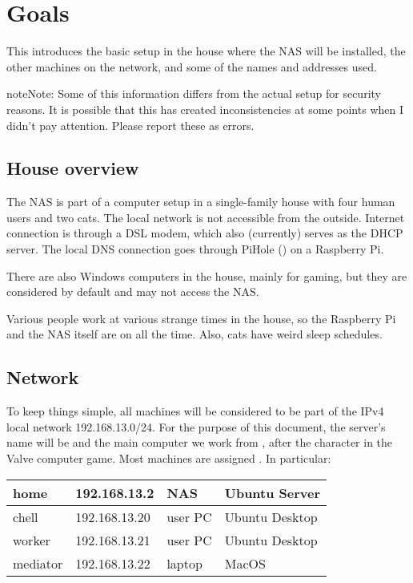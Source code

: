 \documentclass[a4paper,10pt,english]{sphinxmanual}
\begin{document}
\chapter{Goals}
\label{\detokenize{goals:goals}}\label{\detokenize{goals::doc}}
This introduces the basic setup in the house where the NAS will be installed,
the other machines on the network, and some of the names and addresses used.

\begin{sphinxadmonition}{note}{Note:}
Some of this information differs from the actual setup for security
reasons. It is possible that this has created inconsistencies at some
points when I didn’t pay attention. Please report these as errors.
\end{sphinxadmonition}


\section{House overview}
\label{\detokenize{goals:house-overview}}
The NAS is part of a computer setup in a single-family house with four human
users and two cats. The local network is not accessible from the outside.
Internet connection is through a DSL modem, which also (currently) serves as the
DHCP server. The local DNS connection goes through PiHole ()
on a Raspberry Pi.

There are also Windows computers in the house, mainly for gaming, but they are
considered  by default and may not access the NAS.

Various people work at various strange times in the house, so the Raspberry Pi
and the NAS itself are on all the time. Also, cats have weird sleep schedules.


\section{Network}
\label{\detokenize{goals:network}}
To keep things simple, all machines will be considered to be part of the IPv4
local network 192.168.13.0/24. For the purpose of this document, the server’s
name will be  and the main computer we work from , after the
character in the Valve computer game. Most machines are assigned . In particular:


\begin{savenotes}\sphinxattablestart
\centering
\begin{tabulary}{\linewidth}[t]{|T|T|T|T|}
\hline

home
&
192.168.13.2
&
NAS
&
Ubuntu Server
\\
\hline
chell
&
192.168.13.20
&
user PC
&
Ubuntu Desktop
\\
\hline
worker
&
192.168.13.21
&
user PC
&
Ubuntu Desktop
\\
\hline
mediator
&
192.168.13.22
&
laptop
&
MacOS
\\
\hline
\end{tabulary}
\par
\sphinxattableend\end{savenotes}
\end{document}
